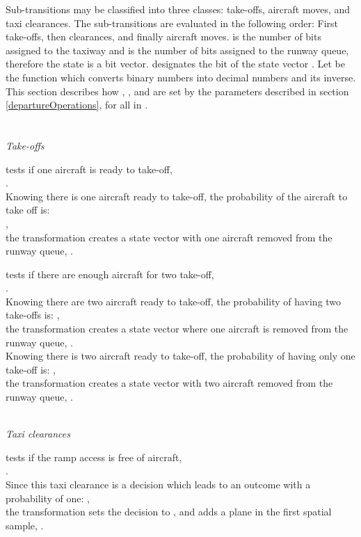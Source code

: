 \documentclass[letterpaper]{article}
\begin{document}
Sub-transitions may be classified into three classes: take-offs, aircraft moves, and taxi clearances.
The sub-transitions are evaluated in the following order: First take-offs, then clearances, and finally aircraft moves.
  is the number of bits assigned to the taxiway and  is the number of bits assigned to the runway queue, 
 therefore the state  is a  bit vector.  designates the  bit of the state vector . 
 Let  be the function which converts binary numbers into decimal numbers and  its inverse. 
 This section describes how , , and  are set by the parameters described
in section \ref{departureOperations}, for all  in .
\\
\\
\emph{\\Take-offs}
\begin{description}
\item  tests if one aircraft is ready to take-off,\\
. \\
Knowing there is one aircraft ready to take-off, the probability of the aircraft to take off is: \\ ,\\
 the transformation  creates a state vector with one aircraft removed from the runway queue, .

\item  tests if there are enough aircraft for two take-off,\\
  .\\
 Knowing there are two aircraft ready to take-off, the probability of having two take-offs is: , \\
 the transformation  creates a state vector where one aircraft is removed from the runway queue, . \\
 Knowing there is two aircraft ready to take-off, the probability of having only one take-off is: ,\\
 the transformation  creates a state vector with two aircraft removed from the runway queue, .
\end{description}

\emph{\\Taxi clearances}
\begin{description}
\item  tests if the ramp access is free of aircraft,\\
.\\
Since this taxi clearance is a decision which leads to an outcome with a probability of one: ,\\
the transformation  sets the decision to , and adds a plane in the first spatial sample, .
\end{description}
\end{document}
